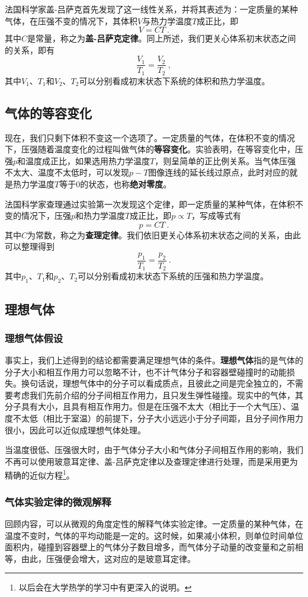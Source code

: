 法国科学家盖-吕萨克首先发现了这一线性关系，并将其表述为：一定质量的某种气体，在压强不变的情况下，其体积$V$与热力学温度$T$成正比，即
$$V=CT~.$$
其中$C$是常量，称之为\textbf{盖-吕萨克定律}。同上所述，我们更关心体系初末状态之间的关系，即有$$\dfrac{V_1}{T_1}=\dfrac{V_2}{T_2}~,$$
其中$V_1$、$T_1$和$V_2$、$T_2$可以分别看成初末状态下系统的体积和热力学温度。

\subsection{气体的等容变化} 
现在，我们只剩下体积不变这一个选项了。一定质量的气体，在体积不变的情况下，压强随着温度变化的过程叫做气体的\textbf{等容变化}。实验表明，在等容变化中，压强$p$和温度成正比，如果选用热力学温度$T$，则呈简单的正比例关系。当气体压强不太大、温度不太低时，可以发现$p-T$图像连线的延长线过原点，此时对应的就是热力学温度$T$等于$0$的状态，也称\textbf{绝对零度}。

法国科学家查理通过实验第一次发现这个定律，即一定质量的某种气体，在体积不变的情况下，压强$p$和热力学温度$T$成正比，即$p\propto T$，写成等式有
$$p=CT~.$$
其中$C$为常数，称之为\textbf{查理定律}。我们依旧更关心体系初末状态之间的关系，由此可以整理得到$$\dfrac{p_1}{T_1}=\dfrac{p_2}{T_2}~.$$
其中$p_1$、$T_1$和$p_2$、$T_2$可以分别看成初末状态下系统的压强和热力学温度。

\subsection{理想气体}
\subsubsection{理想气体假设}
事实上，我们上述得到的结论都需要满足理想气体的条件。\textbf{理想气体}指的是气体的分子大小和相互作用力可以忽略不计，也不计气体分子和容器壁碰撞时的动能损失。换句话说，理想气体中的分子可以看成质点，且彼此之间是完全独立的，不需要考虑我们先前介绍的分子间相互作用力，且只发生弹性碰撞。现实中的气体，其分子具有大小，且具有相互作用力。但是在压强不太大（相比于一个大气压）、温度不太低（相比于室温）的前提下，分子大小远远小于分子间距，且分子间作用力很小，因此可以近似成理想气体处理。

当温度很低、压强很大时，由于气体分子大小和气体分子间相互作用的影响，我们不再可以使用玻意耳定律、盖-吕萨克定律以及查理定律进行处理，而是采用更为精确的近似方程\footnote{以后会在大学热学的学习中有更深入的说明。}。

\subsubsection{气体实验定律的微观解释}
 回顾内容，可以从微观的角度定性的解释气体实验定律。一定质量的某种气体，在温度不变时，气体的平均动能是一定的。这时候，如果减小体积，则单位时间单位面积内，碰撞到容器壁上的气体分子数目增多，而气体分子动量的改变量和之前相等，由此，压强便会增大，这对应的是玻意耳定律。

